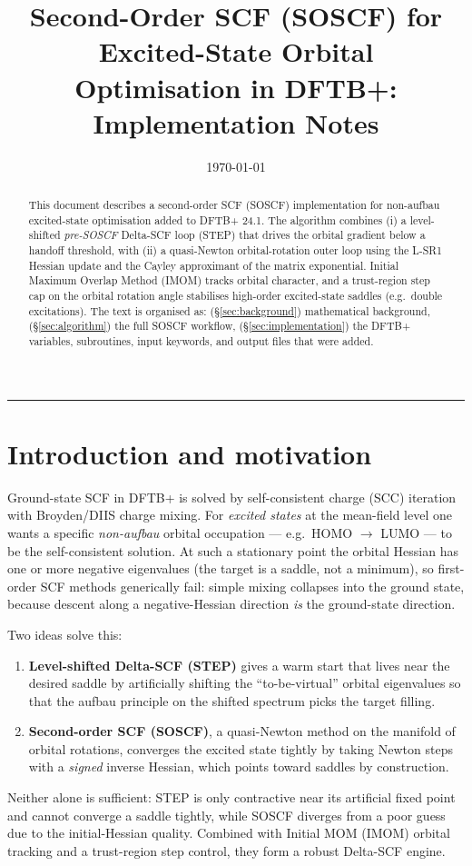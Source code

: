 \documentclass[11pt,a4paper]{article}
\title{\textbf{Second-Order SCF (SOSCF) for Excited-State Orbital\\
Optimisation in DFTB+:\\ Implementation Notes}}
\author{}
\date{\today}
\begin{document}
\maketitle

\begin{abstract}
This document describes a second-order SCF (SOSCF) implementation for
non-aufbau excited-state optimisation added to DFTB+ 24.1. The algorithm
combines (i) a level-shifted \emph{pre-SOSCF} Delta-SCF loop (STEP) that
drives the orbital gradient below a handoff threshold, with (ii) a
quasi-Newton orbital-rotation outer loop using the L-SR1 Hessian update
and the Cayley approximant of the matrix exponential.
Initial Maximum Overlap Method (IMOM) tracks orbital character, and a
trust-region step cap on the orbital rotation angle stabilises high-order
excited-state saddles (e.g.\ double excitations).
The text is organised as:
(\S\ref{sec:background}) mathematical background,
(\S\ref{sec:algorithm}) the full SOSCF workflow,
(\S\ref{sec:implementation}) the DFTB+ variables, subroutines, input
keywords, and output files that were added.
\end{abstract}

\tableofcontents
\bigskip
\hrule
\bigskip

\section{Introduction and motivation}

Ground-state SCF in DFTB+ is solved by self-consistent charge (SCC)
iteration with Broyden/DIIS charge mixing. For \emph{excited states}
at the mean-field level one wants a specific \emph{non-aufbau} orbital
occupation --- e.g.\ HOMO $\to$ LUMO --- to be the self-consistent
solution. At such a stationary point the orbital Hessian has one or
more negative eigenvalues (the target is a saddle, not a minimum), so
first-order SCF methods generically fail: simple mixing collapses into
the ground state, because descent along a negative-Hessian direction
\emph{is} the ground-state direction.

Two ideas solve this:
\begin{enumerate}[label=(\arabic*),leftmargin=*]
\item \textbf{Level-shifted Delta-SCF (STEP)} gives a warm start that
lives near the desired saddle by artificially shifting the
``to-be-virtual'' orbital eigenvalues so that the aufbau principle on
the shifted spectrum picks the target filling.
\item \textbf{Second-order SCF (SOSCF)}, a quasi-Newton method on the
manifold of orbital rotations, converges the excited state tightly by
taking Newton steps with a \emph{signed} inverse Hessian, which points
toward saddles by construction.
\end{enumerate}
Neither alone is sufficient: STEP is only contractive near its
artificial fixed point and cannot converge a saddle tightly, while
SOSCF diverges from a poor guess due to the initial-Hessian quality.
Combined with Initial MOM (IMOM) orbital tracking and a trust-region
step control, they form a robust Delta-SCF engine.
\end{document}
